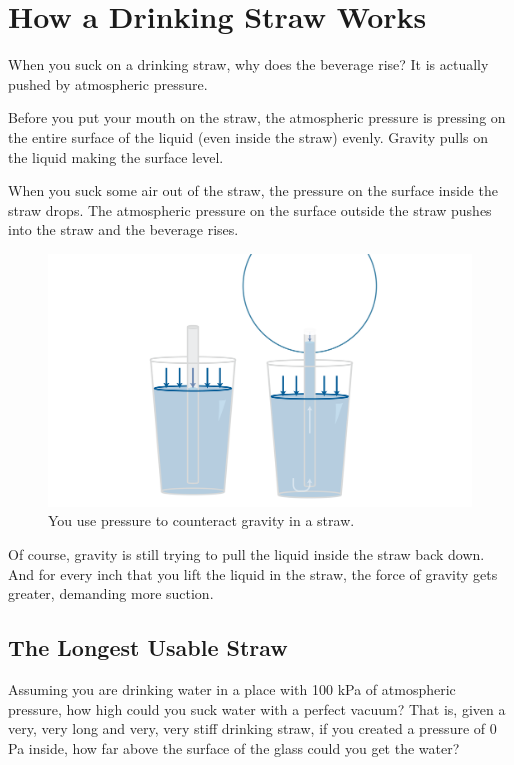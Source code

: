 \section{How a Drinking Straw Works}

When you suck on a drinking straw,  why does the beverage rise?  
It is actually pushed by atmospheric pressure. 

Before you put your mouth on the straw,  the atmospheric pressure is pressing on the 
entire surface of the liquid (even inside the straw) evenly.   Gravity pulls on the liquid making the surface
level.

When you suck some air out of the straw,  the pressure on the surface inside the straw drops.  The atmospheric pressure on the surface outside the straw pushes into the straw and the beverage rises.
\begin{figure}[htbp]
    \centering
    \includegraphics[width=\textwidth]{straw.png}
    \caption{You use pressure to counteract gravity in a straw.}
    \label{fig:straw}
\end{figure}

Of course,  gravity is still trying to pull the liquid inside the straw back down.  And for every inch that you lift the liquid in the straw,  the force of gravity gets greater, demanding more suction.

\subsection{The Longest Usable Straw}
  
Assuming you are drinking water in a place with 100 kPa of atmospheric pressure, how high could 
you suck water with a perfect vacuum?  That is,  given a very, very long and very, very stiff drinking straw,  if you created a pressure of 0 Pa inside,  how far above the surface of the glass 
could you get the water?

